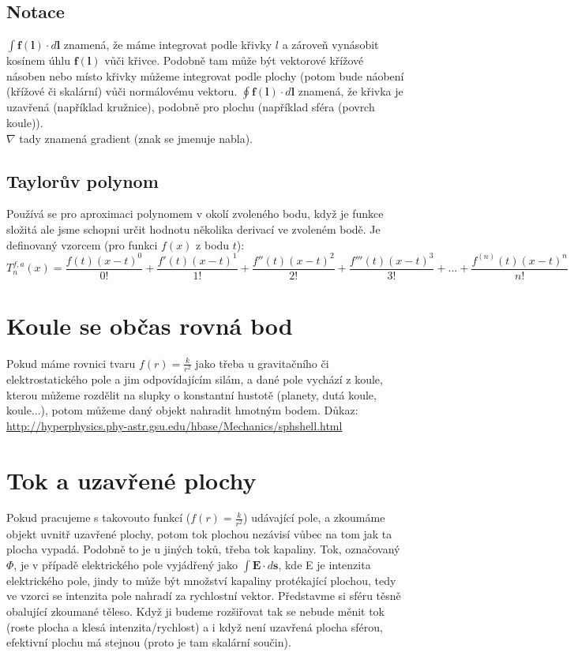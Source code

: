 \documentclass[titlepage]{report}
\begin{document}
\subsection{Notace}
$\int \boldsymbol f(\boldsymbol l) \cdot d\boldsymbol l$ znamená, že máme integrovat podle křivky $l$ a zároveň vynásobit kosínem úhlu $\boldsymbol f(\boldsymbol l)$ vůči křivce. Podobně tam může být vektorové křížové násoben nebo místo křivky můžeme integrovat podle plochy (potom bude náobení (křížové či skalární) vůči normálovému vektoru. $\oint \boldsymbol f(\boldsymbol l) \cdot d\boldsymbol l$ znamená, že křivka je uzavřená (například kružnice), podobně pro plochu (například sféra (povrch koule)).\\
$\nabla$ tady znamená gradient (znak se jmenuje nabla).
\subsection{Taylorův polynom}
Používá se pro aproximaci polynomem v okolí zvoleného bodu, když je funkce složitá ale jsme schopni určit hodnotu několika derivací ve zvoleném bodě. Je definovaný vzorcem (pro funkci $f(x)$ z bodu $t$):
\begin{equation}
T_n^{f,a}(x) = \frac{f(t)(x-t)^0}{0!} + \frac{f'(t)(x-t)^1}{1!} + \frac{f''(t)(x-t)^2}{2!} + \frac{f'''(t)(x-t)^3}{3!} + ... + \frac{f^{(n)}(t)(x-t)^n}{n!}
\end{equation}
\section{Koule se občas rovná bod}
Pokud máme rovnici tvaru $f(r) = \frac{k}{r^2}$ jako třeba u gravitačního či elektrostatického pole a jim odpovídajícím silám, a dané pole vychází z koule, kterou můžeme rozdělit na slupky o konstantní hustotě (planety, dutá koule, koule...), potom můžeme daný objekt nahradit hmotným bodem. Důkaz: \url{http://hyperphysics.phy-astr.gsu.edu/hbase/Mechanics/sphshell.html}\\
\section{Tok a uzavřené plochy}\label{sec:tok}
Pokud pracujeme s takovouto funkcí ($f(r) = \frac{k}{r^2}$) udávající pole, a zkoumáme objekt uvnitř uzavřené plochy, potom tok plochou nezávisí vůbec na tom jak ta plocha vypadá. Podobně to je u jiných toků, třeba tok kapaliny. Tok, označovaný $\Phi$, je v případě elektrického pole vyjádřený jako $\int \boldsymbol E \cdot d\boldsymbol s$, kde E je intenzita elektrického pole, jindy to může být množství kapaliny protékající plochou, tedy ve vzorci se intenzita pole nahradí za rychlostní vektor. Představme si sféru těsně obalující zkoumané těleso. Když ji budeme rozšiřovat tak se nebude měnit tok (roste plocha a klesá  intenzita/rychlost) a i když není uzavřená plocha sférou, efektivní plochu má stejnou (proto je tam skalární součin).
\end{document}
